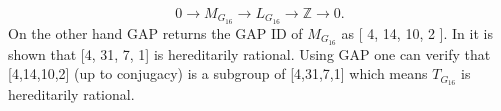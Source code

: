 \documentclass{article}
\theoremstyle{plain}
\theoremstyle{definition}
\newcommand{\Z}{\ensuremath{\mathbb{Z}}}
\newcommand{\exactseq}[1]{\ensuremath{0 \longrightarrow M_{#1} \longrightarrow L_{#1} \longrightarrow \Z \longrightarrow 0}}
\begin{document}
$$\exactseq{G_{16}}.$$
On the other hand GAP returns the GAP ID of $M_{G_{16}}$  as [ 4, 14, 10, 2 ].
In \cite{Nicole1} it is shown that [4, 31, 7, 1] is hereditarily rational. Using GAP one can verify that [4,14,10,2] (up to conjugacy) is a subgroup of [4,31,7,1] which means $T_{G_{16}}$ is hereditarily rational.\\
\\
%
\end{document}
